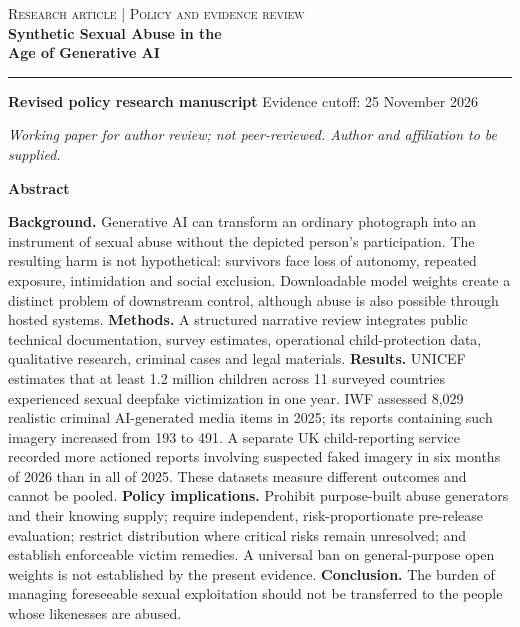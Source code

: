\documentclass[10pt,a4paper]{article}
\begin{document}
\thispagestyle{empty}
{\large\textsc{Research article | Policy and evidence review}}\\[8mm]
{\color{ink}\fontsize{25}{29}\selectfont\bfseries Synthetic Sexual Abuse in the\\Age of Generative AI}\par
\vspace{3mm}{\Large Evidence of harm, accountability gaps, and the case\\for targeted prohibition and release controls}\par
\vspace{4mm}\rule{\linewidth}{0.8pt}\par
\textbf{Revised policy research manuscript} \hfill Evidence cutoff: 25 November 2026\par
\textit{Working paper for author review; not peer-reviewed. Author and affiliation to be supplied.}\par
\vspace{3mm}\textbf{Abstract}\par

\textbf{Background.} Generative AI can transform an ordinary photograph into an instrument of sexual abuse without the depicted person's participation. The resulting harm is not hypothetical: survivors face loss of autonomy, repeated exposure, intimidation and social exclusion. Downloadable model weights create a distinct problem of downstream control, although abuse is also possible through hosted systems. \textbf{Methods.} A structured narrative review integrates public technical documentation, survey estimates, operational child-protection data, qualitative research, criminal cases and legal materials. \textbf{Results.} UNICEF estimates that at least 1.2 million children across 11 surveyed countries experienced sexual deepfake victimization in one year. IWF assessed 8,029 realistic criminal AI-generated media items in 2025; its reports containing such imagery increased from 193 to 491. A separate UK child-reporting service recorded more actioned reports involving suspected faked imagery in six months of 2026 than in all of 2025. These datasets measure different outcomes and cannot be pooled. \textbf{Policy implications.} Prohibit purpose-built abuse generators and their knowing supply; require independent, risk-proportionate pre-release evaluation; restrict distribution where critical risks remain unresolved; and establish enforceable victim remedies. A universal ban on general-purpose open weights is not established by the present evidence. \textbf{Conclusion.} The burden of managing foreseeable sexual exploitation should not be transferred to the people whose likenesses are abused. \cite{iwf,unicef12,reportremove,deepfakeimpact,uknotes,ntia}
\end{document}
